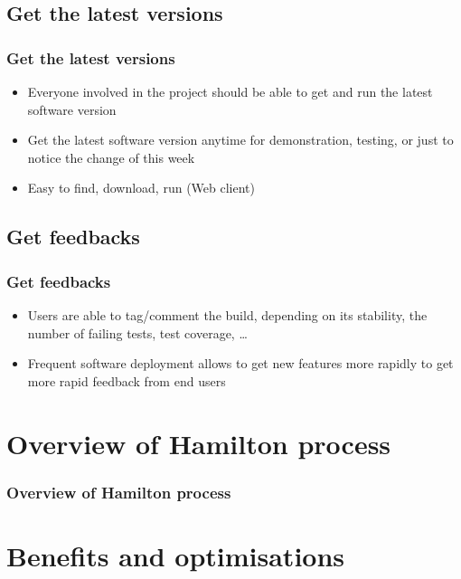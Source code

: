 \documentclass{beamer}
\begin{document}
\subsection[Get the latest versions]{Get the latest versions}
\begin{frame}
\frametitle{Get the latest versions}

\begin{itemize}
  \item<1-> Everyone involved in the project should be able to get
  and run the latest software version
  \item<2-> Get the latest software version anytime for demonstration, testing,
  or just to notice the change of this week
  \item<3-> Easy to find, download, run (Web client) 
\end{itemize}

\end{frame}


\subsection[Get feedbacks]{Get feedbacks}
\begin{frame}
\frametitle{Get feedbacks}

\begin{itemize}
  \item Users are able to tag/comment the build, depending on its stability,
  the number of failing tests, test coverage, \ldots
  \item Frequent software deployment allows to get new features more rapidly to
  get more rapid feedback\cite{Fowler06} from end users
\end{itemize}

\end{frame}


\section*{Overview of Hamilton process}
\begin{frame}
\frametitle<presentation>{Overview of Hamilton process}

\centering
{}

\end{frame}

\section[Benefits and optimisations]{Benefits and optimisations}
\end{document}
